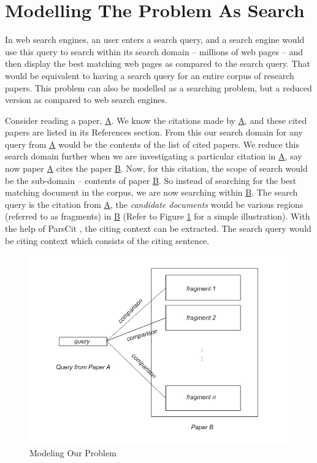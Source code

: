 \section{Modelling The Problem As Search}
In web search engines, an user enters a search query, and a search engine would use this query to search within its search domain -- millions of web pages -- and then display the best matching web pages as compared to the search query. That would be equivalent to having a search query for an entire corpus of research papers. This problem can also be modelled as a searching problem, but a reduced version as compared to web search engines.

Consider reading a paper, \url{A}. We know the citations made by \url{A}, and these cited papers are listed in its References section. From this our search domain for any query from \url{A} would be the contents of the list of cited papers. We reduce this search domain further when we are investigating a particular citation in \url{A}, say now paper \url{A} cites the paper \url{B}. Now, for this citation, the scope of search would be the sub-domain -- contents of paper \url{B}. So instead of searching for the best matching document in the corpus, we are now searching within \url{B}. The search query is the citation from \url{A}, the {\it candidate documents} would be various regions (referred to as fragments) in \url{B} (Refer to Figure \ref{fig:model} for a simple illustration). With the help of ParsCit \cite{parscit}, the citing context can be extracted. The search query would be citing context which consists of the citing sentence.

\begin{figure}[h]
  \centering
  \includegraphics[scale=0.50]{./model}
  \caption{Modeling Our Problem}
  \label{fig:model}
\end{figure}

